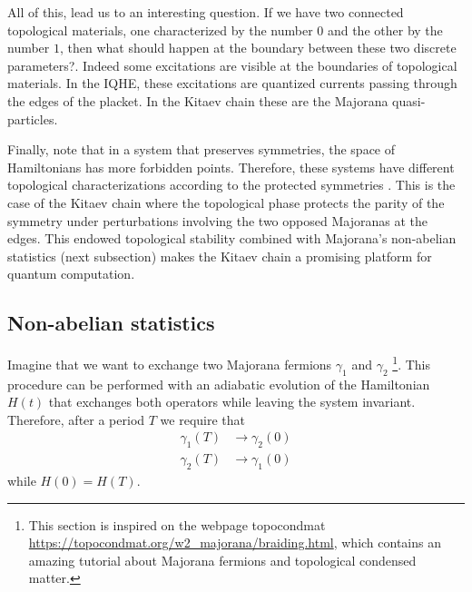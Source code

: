 All of this, lead us to an interesting question. If we have two connected topological materials, one characterized by the  number $0$ and the other by the number $1$, then what should happen at the boundary between these two discrete parameters?. Indeed some excitations are visible at the boundaries of topological materials. In the IQHE, these excitations are quantized currents passing through the edges of the placket. In the Kitaev chain  these are the Majorana quasi-particles. 

Finally,  note that in a system that preserves symmetries, the space of Hamiltonians has more forbidden points. Therefore, these systems have  different topological characterizations according to the protected symmetries \cite{ryu_topological_2010}.  This is the case of the Kitaev chain where the topological phase  protects the parity of the symmetry under perturbations involving the two opposed Majoranas at the edges. This endowed topological stability combined with Majorana's non-abelian statistics (next subsection) makes the Kitaev chain a promising platform for quantum computation. 





\subsection{Non-abelian statistics  \label{subsec:non-ab}}




Imagine that we want to exchange two Majorana fermions $\gamma_1$ and $\gamma_2$ \footnote{This section is inspired on the webpage topocondmat \url{https://topocondmat.org/w2_majorana/braiding.html}, which contains an amazing tutorial about Majorana fermions and topological condensed matter. }. This procedure can be performed with an adiabatic evolution of the Hamiltonian $H(t)$ that exchanges both operators while leaving the system invariant. Therefore, after a period $T$ we require that 
\begin{equation}
\begin{aligned}
\gamma_1(T) &\rightarrow \gamma_2(0) \\
\gamma_2(T) &\rightarrow  \gamma_1(0) 
\end{aligned}
\label{eq:exchange}
\end{equation}
while  $H(0)=H(T)$. 


